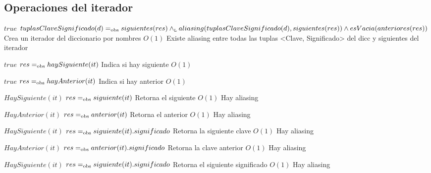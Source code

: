

\subsection{Operaciones del iterador}
 {$true$}
 {$tuplasClaveSignificado(d) =_{\mathrm{obs}} siguientes(res) \land_{\mathrm{\scriptscriptstyle{L}}} aliasing(tuplasClaveSignificado(d),siguientes(res)) \land esVacia(anteriores(res))$}
 {Crea un iterador del diccionario por nombres}
 {$O(1)$}
 {Existe aliasing entre todas las tuplas <Clave, Significado> del dicc y siguientes del iterador}

 {$true$}
 {$res =_{\mathrm{obs}} haySiguiente(it)$}
 {Indica si hay siguiente}
 {$O(1)$}
 {}

 {$true$}
 {$res =_{\mathrm{obs}} hayAnterior(it)$}
 {Indica si hay anterior}
 {$O(1)$}
 {}

 {$HaySiguiente(it)$}
 {$res =_{\mathrm{obs}} siguiente(it)$}
 {Retorna el siguiente}
 {$O(1)$}
 {Hay aliasing}

 {$HayAnterior(it)$}
 {$res =_{\mathrm{obs}} anterior(it)$}
 {Retorna el anterior}
 {$O(1)$}
 {Hay aliasing}

 {$HaySiguiente(it)$}
 {$res =_{\mathrm{obs}} siguiente(it).significado$}
 {Retorna la siguiente clave}
 {$O(1)$}
 {Hay aliasing}

 {$HayAnterior(it)$}
 {$res =_{\mathrm{obs}} anterior(it).significado$}
 {Retorna la clave anterior}
 {$O(1)$}
 {Hay aliasing}

 {$HaySiguiente(it)$}
 {$res =_{\mathrm{obs}} siguiente(it).significado$}
 {Retorna el siguiente significado}
 {$O(1)$}
 {Hay aliasing}

